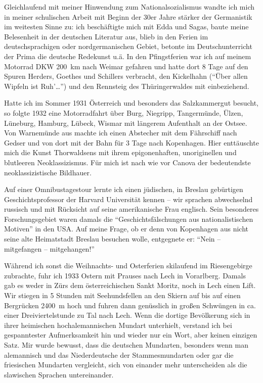 Gleichlaufend mit meiner Hinwendung zum Nationalsozialismus wandte ich mich in meiner schulischen Arbeit mit Beginn der 30er Jahre stärker der Germanistik im weitesten Sinne zu: ich beschäftigte mich mit Edda und Sagas, baute meine Belesenheit in der deutschen Literatur aus, blieb in den Ferien im deutschsprachigen oder nordgermanischen Gebiet, betonte im Deutschunterricht der Prima die deutsche Redekunst u.ä. In den Pfingstferien war ich auf meinem Motorrad DKW 200~km nach Weimar gefahren und hatte dort 8 Tage auf den Spuren Herders, Goethes und Schillers verbracht, den Kickelhahn (\enquote{Über allen Wipfeln ist Ruh'\dots}) und den Rennsteig des Thüringerwaldes mit einbeziehend.

Hatte ich im Sommer 1931 Österreich und besonders das Salzkammergut besucht, so folgte 1932 eine Motorradfahrt über Burg, Niegripp, Tangermünde, Ülzen, Lüneburg, Hamburg, Lübeck, Wismar mit längerem Aufenthalt an der Ostsee. Von Warnemünde aus machte ich einen Abstecher mit dem Fährschiff nach Gedser und von dort mit der Bahn für 3 Tage nach Kopenhagen. Hier enttäuschte mich die Kunst Thorwaldsens mit ihrem epigonenhaften, unoriginellen und blutleeren Neoklassizismus. Für mich ist nach wie vor Canova der bedeutendste neoklassizistische Bildhauer.

Auf einer Omnibustagestour lernte ich einen jüdischen, in Breslau gebürtigen Geschichtsprofessor der Harvard Universität kennen -- wir sprachen abwechselnd russisch und mit Rücksicht auf seine amerikanische Frau englisch. Sein besonderes Forschungsgebiet waren damals die \enquote{Geschichtsfälschungen aus nationalistischen Motiven} in den USA. Auf meine Frage, ob er denn von Kopenhagen aus nicht seine alte Heimatstadt Breslau besuchen wolle, entgegnete er: \enquote{Nein -- mitgefangen -- mitgehangen!}

Während ich sonst die Weihnachts- und Osterferien skilaufend im Riesengebirge zubrachte, fuhr ich 1933 Ostern mit Prauses nach Lech in Vorarlberg. Damals gab es weder in Zürs dem österreichischen Sankt Moritz, noch in Lech einen Lift. Wir stiegen in 5 Stunden mit Seehundsfellen an den Skiern auf bis auf einen Bergrücken 2400~m hoch und fuhren dann genüsslich in großen Schwüngen in ca. einer Dreiviertelstunde zu Tal nach Lech. Wenn die dortige Bevölkerung sich in ihrer heimischen hochalemannischen Mundart unterhielt, verstand ich bei gespanntester Aufmerksamkeit hin und wieder nur ein Wort, aber keinen einzigen Satz. Mir wurde bewusst, dass die deutschen Mundarten, besonders wenn man alemannisch und das Niederdeutsche der Stammesmundarten oder gar die friesischen Mundarten vergleicht, sich von einander mehr unterscheiden als die slawischen Sprachen untereinander.

